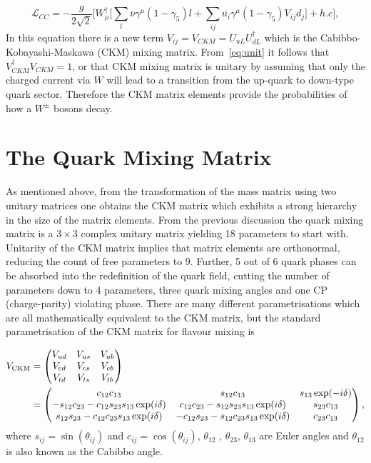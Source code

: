 \begin{equation}
	\mathcal{L}_{CC}= - \frac{g}{2\sqrt{2}}\Big[W^{\dagger}_{\mu}\big[\sum_{l}\overline{\nu}\gamma^{\mu}(1-\gamma_{5})l + \sum_{ij}\overline{u_{i}}\gamma^{\mu}(1-\gamma_{5})V_{ij}d_{j}\big] + h.c\Big], 
\label{eq:LC}
\end{equation}
In this equation there is a new term $V_{ij}=V_{CKM}= U_{uL} U_{dL}^\dag$ which is the Cabibbo-Kobayashi-Maskawa (CKM) mixing matrix. From~\autoref{eq:unit} it follows that $V^{\dagger}_{CKM}V_{CKM}=1$, or that \gls{CKM} mixing matrix is unitary by assuming that only the charged current via $W$ will lead to a transition from the up-quark to down-type quark sector. Therefore the CKM matrix elements provide the probabilities of how a $W^{\pm}$ bosons decay.
 





\section{The Quark Mixing Matrix}
\label{ckm}
As mentioned above, from the transformation of the mass matrix using two unitary matrices one obtains the \gls{CKM} matrix which exhibits a strong hierarchy in the size of the matrix elements. From the previous discussion the quark mixing matrix is a $3 \times 3$ complex unitary matrix yielding 18 parameters to start with. Unitarity of the \gls{CKM} matrix implies that matrix elements are orthonormal, reducing the count of free parameters to 9. Further, 5 out of 6 quark phases can be absorbed into the redefinition of the quark field, cutting the number of parameters down to 4 parameters, three quark mixing angles and one CP (charge-parity) violating phase. There are many different parametrisations which are all mathematically equivalent to the \gls{CKM} matrix, but the standard parametrisation of the \gls{CKM} matrix for flavour mixing is

\begin{align}
V_{\rm CKM} &=  \begin{pmatrix}   V_{ud} & V_{us} & V_{ub} \cr
    V_{cd} & V_{cs} & V_{cb} \cr
    V_{td} & V_{ts} & V_{tb} \cr \end{pmatrix} \\
 &= \begin{pmatrix}c_{12}c_{13}& s_{12}c_{13} & s_{13}\exp(-i\delta) \cr
-s_{12}c_{23}-c_{12}s_{23}s_{13}\exp(i\delta) & c_{12}c_{23}- 
s_{12}s_{23}s_{13}\exp(i\delta) & s_{23}c_{13} \cr 
s_{12}s_{23}- c_{12}c_{23}s_{13}\exp(i\delta) & 
-c_{12}s_{23}-s_{12}c_{23}s_{13}\exp(i\delta) & c_{23}c_{13}\end{pmatrix},
\end{align}
where $s_{ij} = \sin(\theta_{ij})$ and $c_{ij} = \cos(\theta_{ij})$, $\theta_{12}$ , $\theta_{23}$, $\theta_{13}$ are Euler angles and $\theta_{12}$ is also known as the Cabibbo angle.

